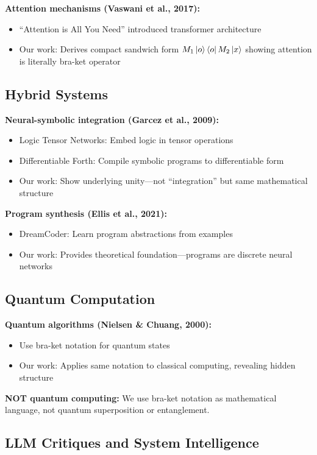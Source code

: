 \documentclass[11pt,a4paper]{article}
\theoremstyle{definition}
\begin{document}
\textbf{Attention mechanisms (Vaswani et al., 2017):}
\begin{itemize}
\item ``Attention is All You Need'' introduced transformer architecture
\item Our work: Derives compact sandwich form $M_1 \ket{o}\bra{o} M_2 \ket{x}$ showing attention is literally bra-ket operator
\end{itemize}

\subsection{Hybrid Systems}

\textbf{Neural-symbolic integration (Garcez et al., 2009):}
\begin{itemize}
\item Logic Tensor Networks: Embed logic in tensor operations
\item Differentiable Forth: Compile symbolic programs to differentiable form
\item Our work: Show underlying unity---not ``integration'' but same mathematical structure
\end{itemize}

\textbf{Program synthesis (Ellis et al., 2021):}
\begin{itemize}
\item DreamCoder: Learn program abstractions from examples
\item Our work: Provides theoretical foundation---programs are discrete neural networks
\end{itemize}

\subsection{Quantum Computation}

\textbf{Quantum algorithms (Nielsen \& Chuang, 2000):}
\begin{itemize}
\item Use bra-ket notation for quantum states
\item Our work: Applies same notation to classical computing, revealing hidden structure
\end{itemize}

\textbf{NOT quantum computing:} We use bra-ket notation as mathematical language, not quantum superposition or entanglement.

\subsection{LLM Critiques and System Intelligence}
\end{document}
